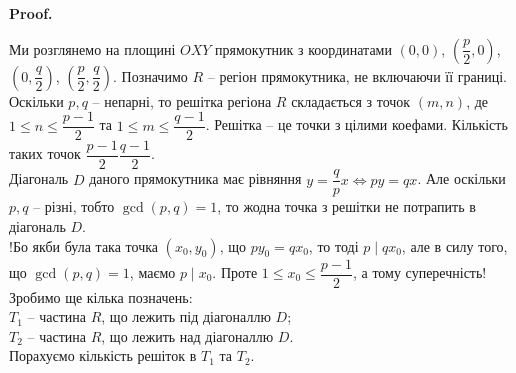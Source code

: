 \documentclass[a4paper, 14pt]{extarticle}
\makeatletter
\theoremstyle{theoremdd}
\theoremstyle{theoremdd}
\theoremstyle{theoremdd}
\theoremstyle{theoremdd}
\theoremstyle{theoremdd}
\theoremstyle{theoremdd}
\theoremstyle{theoremdd}
\theoremstyle{theoremdd}
\def\qed{$\blacksquare$}
\renewenvironment{proof}[1][Proof.\\]{\par
\pushQED{\hfill \qed}%
\normalfont \topsep6\p@\@plus6\p@\relax
\trivlist
\item\relax
{\bfseries
#1\@addpunct{.}}\hspace\labelsep\ignorespaces
}{%
\popQED\endtrivlist\@endpefalse
}
\makeatother
\begin{document}
\begin{proof}
Ми розглянемо на площині $OXY$ прямокутник з координатами $\left(0,0 \right)$, $\left(\dfrac{p}{2},0 \right)$, $\left(0,\dfrac{q}{2} \right)$, $\left(\dfrac{p}{2},\dfrac{q}{2} \right)$. Позначимо $R$ -- регіон прямокутника, не включаючи її границі.\\
Оскільки $p,q$ -- непарні, то решітка регіона $R$ складається з точок $(m,n)$, де $1 \leq n \leq \dfrac{p-1}{2}$ та $1 \leq m \leq \dfrac{q-1}{2}$. Решітка -- це точки з цілими коефами. Кількість таких точок $\dfrac{p-1}{2} \dfrac{q-1}{2}$.\\
Діагональ $D$ даного прямокутника має рівняння $y = \dfrac{q}{p}x \iff py = qx$. Але оскільки $p,q$ -- різні, тобто $\gcd(p,q) = 1$, то жодна точка з решітки не потрапить в діагональ $D$.\\
!Бо якби була така точка $(x_0,y_0)$, що $py_0 = qx_0$, то тоді $p \mid qx_0$, але в силу того, що $\gcd(p,q) = 1$, маємо $p \mid x_0$. Проте $1 \leq x_0 \leq \dfrac{p-1}{2}$, а тому суперечність!\\
Зробимо ще кілька позначень:\\
$T_1$ -- частина $R$, що лежить під діагоналлю $D$; \\
$T_2$ -- частина $R$, що лежить над діагоналлю $D$. \\
Порахуємо кількість решіток в $T_1$ та $T_2$.
\begin{figure}[H]
\centering
{}
\end{figure}
\end{proof}
\end{document}
